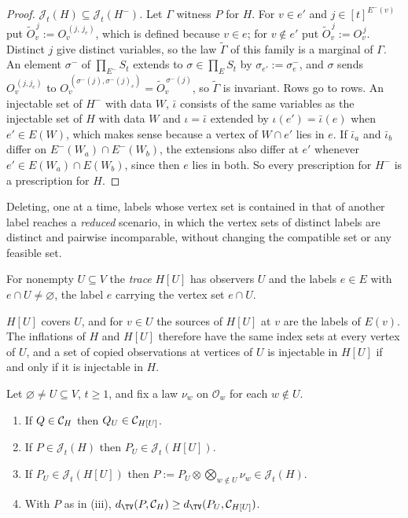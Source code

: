 \begin{proof}
\emph{$\mathcal J_t(H)\subseteq\mathcal J_t(H^-)$.} Let $\Gamma$ witness $P$ for $H$. For $v\in e'$ and $j\in[t]^{E^-(v)}$ put $\widetilde O_v^{\,j}:=O_v^{\,(j,\,j_e)}$, which is defined because $v\in e$; for $v\notin e'$ put $\widetilde O_v^{\,j}:=O_v^{\,j}$. Distinct $j$ give distinct variables, so the law $\widetilde\Gamma$ of this family is a marginal of $\Gamma$. An element $\sigma^-$ of $\prod_{E^-}S_t$ extends to $\sigma\in\prod_ES_t$ by $\sigma_{e'}:=\sigma^-_e$, and $\sigma$ sends $O_v^{\,(j,j_e)}$ to $O_v^{\,(\sigma^-(j),\sigma^-(j)_e)}=\widetilde O_v^{\,\sigma^-(j)}$, so $\widetilde\Gamma$ is invariant. Rows go to rows. An injectable set of $H^-$ with data $W$, $\bar\iota$ consists of the same variables as the injectable set of $H$ with data $W$ and $\iota=\bar\iota$ extended by $\iota(e')=\bar\iota(e)$ when $e'\in E(W)$, which makes sense because a vertex of $W\cap e'$ lies in $e$. If $\bar\iota_a$ and $\bar\iota_b$ differ on $E^-(W_a)\cap E^-(W_b)$, the extensions also differ at $e'$ whenever $e'\in E(W_a)\cap E(W_b)$, since then $e$ lies in both. So every prescription for $H^-$ is a prescription for $H$.
\end{proof}

Deleting, one at a time, labels whose vertex set is contained in that of another label reaches a \emph{reduced} scenario, in which the vertex sets of distinct labels are distinct and pairwise incomparable, without changing the compatible set or any feasible set.

\begin{definition}[Trace]\label{def:trace}
For nonempty $U\subseteq V$ the \emph{trace} $H[U]$ has observers $U$ and the labels $e\in E$ with $e\cap U\ne\varnothing$, the label $e$ carrying the vertex set $e\cap U$.
\end{definition}

$H[U]$ covers $U$, and for $v\in U$ the sources of $H[U]$ at $v$ are the labels of $E(v)$. The inflations of $H$ and $H[U]$ therefore have the same index sets at every vertex of $U$, and a set of copied observations at vertices of $U$ is injectable in $H[U]$ if and only if it is injectable in $H$.

\begin{lemma}\label{lem:htrace}
Let $\varnothing\ne U\subseteq V$, $t\ge1$, and fix a law $\nu_w$ on $\mathcal O_w$ for each $w\notin U$.
\begin{enumerate}[label=(\roman*),nosep]
\item If $Q\in\mathcal C_{H}$ then $Q_U\in\mathcal C_{H[U]}$.
\item If $P\in\mathcal J_t(H)$ then $P_U\in\mathcal J_t(H[U])$.
\item If $P_U\in\mathcal J_t(H[U])$ then $P:=P_U\otimes\bigotimes_{w\notin U}\nu_w\in\mathcal J_t(H)$.
\item With $P$ as in (iii), $d_{\TV}(P,\Cscen{H})\ge d_{\TV}(P_U,\Cscen{H[U]})$.
\end{enumerate}
\end{lemma}

